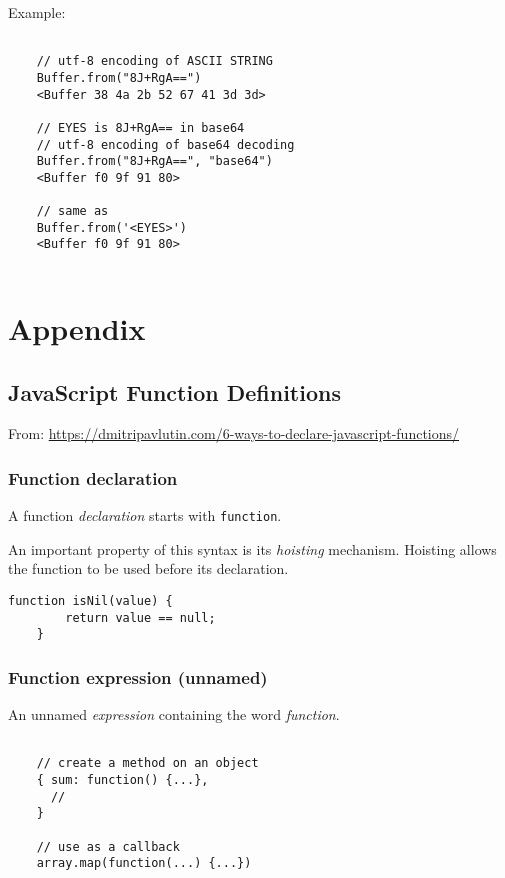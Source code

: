 \documentclass{scrartcl}
\begin{document}
Example:

\begin{lstlisting}[style=ES6]

    // utf-8 encoding of ASCII STRING
    Buffer.from("8J+RgA==")
    <Buffer 38 4a 2b 52 67 41 3d 3d>

    // EYES is 8J+RgA== in base64
    // utf-8 encoding of base64 decoding
    Buffer.from("8J+RgA==", "base64")
    <Buffer f0 9f 91 80>

    // same as
    Buffer.from('<EYES>')
    <Buffer f0 9f 91 80>


\end{lstlisting}


\section{Appendix}

\subsection{JavaScript Function Definitions}

From:  \url{https://dmitripavlutin.com/6-ways-to-declare-javascript-functions/}

\subsubsection{Function declaration}

A function \textit{declaration} starts with \lstinline|function|.

An important property of this syntax is its \textit{hoisting} mechanism. Hoisting allows the function to be used before its declaration.

\begin{lstlisting}[style=ES6]
    function isNil(value) {
        return value == null;
    }
\end{lstlisting}

\subsubsection{Function expression (unnamed)}

An unnamed \textit{expression} containing the word \textit{function}.

\begin{lstlisting}[style=ES6]

    // create a method on an object
    { sum: function() {...},
      //
    }

    // use as a callback
    array.map(function(...) {...})

\end{lstlisting}
\end{document}
